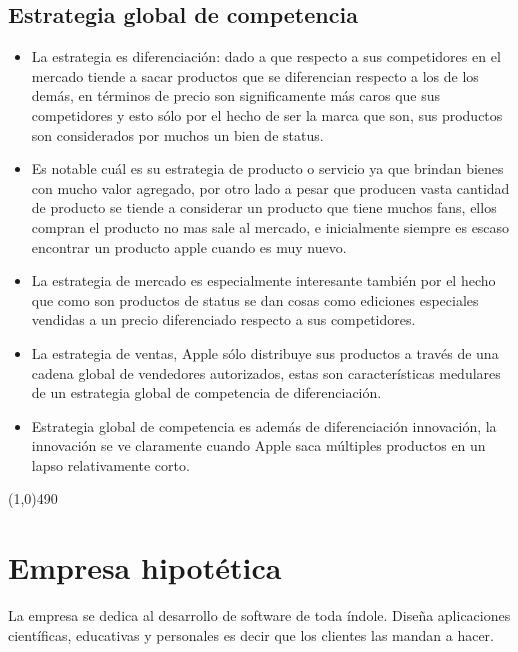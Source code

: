 \documentclass{article}
\begin{document}
\subsection{Estrategia global de competencia}
\begin{itemize}
    \item La estrategia es diferenciación: dado a que respecto a sus competidores en el mercado tiende a sacar productos que se diferencian respecto a los de los demás, en términos de precio son significamente más caros que sus competidores y esto sólo por el hecho de ser la marca que son, sus productos son considerados por muchos un bien de status.
    \item Es notable cuál es su estrategia de producto o servicio ya que brindan bienes con mucho valor agregado, por otro lado a pesar que producen vasta cantidad de producto se tiende a considerar un producto que tiene muchos fans, ellos compran el producto no mas sale al mercado, e inicialmente siempre es escaso encontrar un producto apple cuando es muy nuevo.
    \item La estrategia de mercado es especialmente interesante también por el hecho que como son productos de status se dan cosas como ediciones especiales vendidas a un precio diferenciado respecto a sus competidores.
    \item La estrategia de ventas, Apple sólo distribuye sus productos a través de una cadena global de vendedores autorizados, estas son características medulares de un estrategia global de competencia de diferenciación.
    \item Estrategia global de competencia es además de diferenciación innovación, la innovación se ve claramente cuando Apple saca múltiples productos en un lapso relativamente corto.
\end{itemize}

\begin{center}
\line(1,0){490}
\end{center}
\section{Empresa hipotética}
La empresa se dedica al desarrollo de software de toda índole. Diseña aplicaciones científicas, educativas y personales es decir que los clientes las mandan a hacer.
\end{document}
